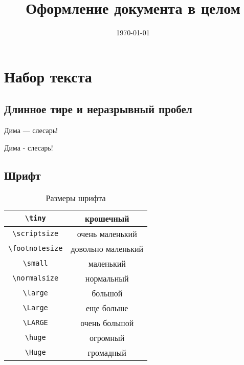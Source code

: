 \documentclass[12pt, a4paper]{article}
\title{Оформление документа в целом}
\date{\today}
\begin{document}

\maketitle

\section{Набор текста}

\subsection{Длинное тире и неразрывный пробел}

Дима --- слесарь!

Дима - слесарь!


\newpage


\subsection{Шрифт}

\begin{table}[h!]
	\caption{Размеры шрифта}
	\centering
		\begin{tabular}{|c|c|}
		\hline	\verb|\tiny|      & \tiny        крошечный \\
		\hline	\verb|\scriptsize|   & \scriptsize  очень маленький\\
			\hline \verb|\footnotesize| & \footnotesize  довольно маленький \\
			\hline \verb|\small|        &  \small        маленький \\
			\hline \verb|\normalsize|   &  \normalsize  нормальный \\
			\hline \verb|\large|        &  \large       большой \\
			\hline \verb|\Large|        &  \Large       еще больше \\[5pt]
			\hline \verb|\LARGE|        &  \LARGE       очень большой \\[5pt]
			\hline \verb|\huge|         &  \huge        огромный \\[5pt]
			\hline \verb|\Huge|         &  \Huge        громадный \\ \hline
		\end{tabular}
\end{table}
\end{document}
